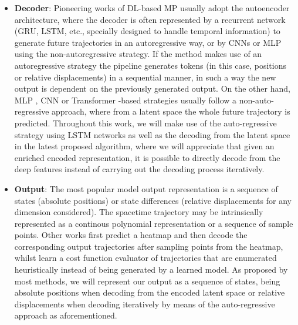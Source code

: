 \begin{itemize}
	\item \textbf{Decoder}: Pioneering works of \ac{DL}-based \ac{MP} usually adopt the autoencoder architecture, where the decoder is often represented by a recurrent network (\ac{GRU}, \ac{LSTM}, etc., specially designed to handle temporal information) to generate future trajectories in an autoregressive way, or by \acp{CNN} \cite{gilles2021home} \cite{gilles2022gohome} or \ac{MLP} \cite{liang2020learning} \cite{schmidt2022crat} using the non-autoregressive strategy. If the method makes use of an autoregressive strategy the pipeline generates tokens (in this case, positions or relative displacements) in a sequential manner, in such a way the new output is dependent on the previously generated output. On the other hand, \ac{MLP} \cite{schmidt2022crat}, \ac{CNN} \cite{gilles2021home} or Transformer \cite{ngiam2022scene}-based strategies usually follow a non-auto-regressive approach, where from a latent space the whole future trajectory is predicted. Throughout this work, we will make use of the auto-regressive strategy using \ac{LSTM} networks as well as the decoding from the latent space in the latest proposed algorithm, where we will appreciate that given an enriched encoded representation, it is possible to directly decode from the deep features instead of carrying out the decoding process iteratively.
	
	\item \textbf{Output}: The most popular model output representation is a sequence of states (absolute positions) or state differences (relative displacements for any dimension considered). The spacetime trajectory may be intrinsically represented as a continous polynomial representation or a sequence of sample points. Other works \cite{gilles2021home} \cite{gilles2022gohome} first predict a heatmap and then decode the corresponding output trajectories after sampling points from the heatmap, whilst \cite{casas2021mp3} \cite{zeng2019end} learn a cost function evaluator of trajectories that are enumerated heuristically instead of being generated by a learned model. As proposed by most methods, we will represent our output as a sequence of states, being absolute positions when decoding from the encoded latent space or relative displacements when decoding iteratively by means of the auto-regressive approach as aforementioned.
	

\end{itemize}
